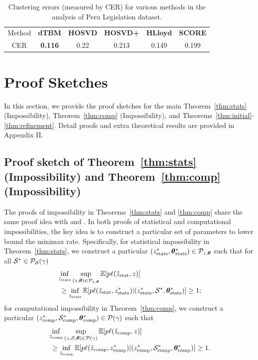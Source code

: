 \documentclass[journal]{IEEEtran}
\theoremstyle{definition}
\theoremstyle{definition}
\begin{document}
\begin{table}[ht]
\renewcommand{\arraystretch}{1.3}
    \centering
    \begin{tabular}{c |c  c cc c} 
    \hline 
        Method & \textbf{\small dTBM} 
        &\textbf{\small HOSVD}
        &\textbf{\small HOSVD+} & \textbf{\small HLloyd} &  \textbf{\small SCORE}\\
         CER & \textbf{0.116}
         &  0.22 
         &0.213 & 0.149 &0.199\\
         \hline
    \end{tabular}
    \caption{Clustering errors (measured by CER) for various methods in the analysis of Peru Legislation dataset.}
    \label{tab:peru}
\end{table}

\section{Proof Sketches}\label{sec:mainproof}


In this section, we provide the proof sketches for the main Theorem~\ref{thm:stats} (Impossibility), Theorem~\ref{thm:comp} (Impossibility), and Theorems~\ref{thm:initial}-\ref{thm:refinement}. Detail proofs and extra theoretical results are provided in Appendix II.

\subsection{Proof sketch of Theorem~\ref{thm:stats} (Impossibility) and Theorem~\ref{thm:comp} (Impossibility)} \label{subsec:impossible}

The proofs of impossibility in Theorems~\ref{thm:stats} and \ref{thm:comp} share the same proof idea with \cite[Theorems 6 and 7]{han2020exact} and \cite[Theorem 2]{gao2018community}. In both proofs of statistical and computational impossibilities, the key idea is to construct a particular set of parameters to lower bound the minimax rate. Specifically, for statistical impossibility in Theorem~\ref{thm:stats}, we construct a particular $(z^*_{\rm stats}, \boldsymbol{\theta}^*_{\rm stats})  \in \mathcal{P}_{z, \boldsymbol{\theta}} $ such that for all $\mathcal{S}^* \in \mathcal{P}_{\mathcal{S}}(\gamma)$
\begin{align}
    & \inf_{\hat z_{\rm stats}} \sup_{(z, \mtheta) \in \tP_{z, \mtheta}} \bbE[p \ell(\hat z_{\rm stat}, z)] \\
     & \ \geq \inf_{\hat z_{\rm stats}} \bbE[p \ell(\hat z_{\rm stat}, z_{\rm stats}^*)| (z^*_{\rm stats}, \tS^*,\mtheta^*_{\rm stats})] \geq 1;\label{eq:stats_impo_sketch}  
\end{align}
for computational impossibility in Theorem~\ref{thm:comp}, we construct a particular $(z^*_{\rm comp}, \mathcal{S}^*_{\rm comp}, \boldsymbol{\theta}^*_{\rm comp}) \in \mathcal{P}(\gamma)$ such that
\begin{align}
    &\inf_{\hat z_{\rm comp}} \sup_{(z, \mathcal{S}, \boldsymbol{\theta}) \in \mathcal{P}(\gamma)} \mathbb{E}[p \ell(\hat z_{\rm comp}, z)] \\
    &\ \geq \inf_{\hat z_{\rm comp}} \mathbb{E}[p \ell(\hat z_{\rm comp}, z_{\rm comp}^*)| (z^*_{\rm comp}, \mathcal{S}^*_{\rm comp},\boldsymbol{\theta}^*_{\rm comp})] \geq 1.
\end{align}
\end{document}
